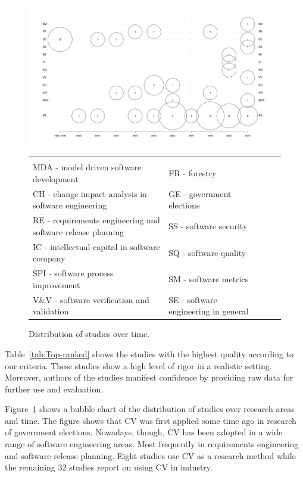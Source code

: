 \begin{figure}
\center
\includegraphics[bb=70bp 40bp 1180bp 670bp,clip,scale=0.28]{fig/bubble}

\begin{tabular}
{l>{\raggedright}b{}l>{\raggedright}b{}l} 
&\tabularnewline
\tiny
MDA - model driven software development  					& \tiny FR - forestry  \tabularnewline
\tiny CH - change impact analysis in software engineering 			& \tiny GE - government elections \tabularnewline
\tiny RE - requirements engineering and software release planning 	& \tiny SS - software security \tabularnewline
\tiny IC - intellectual capital in software company 				& \tiny SQ - software quality \tabularnewline
\tiny SPI - software process improvement 						& \tiny SM - software metrics \tabularnewline
\tiny V\&V - software verification and validation & \tiny SE - software engineering in general\tabularnewline
\end{tabular}
\caption{\label{fig:bubble}Distribution of studies over time.}

\end{figure}

Table~\ref{tab:Top-ranked} shows the studies with the highest quality according to our criteria.
These studies show a high level of rigor in a realistic setting. Moreover, authors of the studies manifest confidence by providing raw data for further use and evaluation.

Figure~\ref{fig:bubble} shows a bubble chart of the distribution of studies over research areas and time.
The figure shows that CV was first applied some time ago in research of government elections.
Nowadays, though, CV has been adopted in a wide range of software engineering areas.
Most frequently in requirements engineering and software release planning.
Eight studies use CV as a research method while the remaining 32 studies report on using CV in industry.

